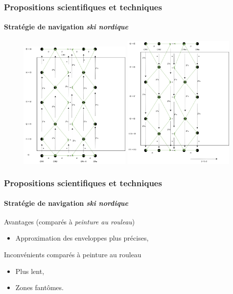 \documentclass{beamer}
\begin{document}
			\begin{frame}
				\frametitle{Propositions scientifiques et techniques}
				\framesubtitle{Stratégie de navigation \textit{ski nordique}}
				\begin{figure}
					\centering
					\includegraphics[width=0.49\textwidth]{graphics/ski_nordique_1.png}
					\includegraphics[width=0.49\textwidth]{graphics/ski_nordique_2.png}
				\end{figure}
			\end{frame}
			\begin{frame}
				\frametitle{Propositions scientifiques et techniques}
				\framesubtitle{Stratégie de navigation \textit{ski nordique}}
				\begin{exampleblock}{Avantages (comparés à \textit{peinture au rouleau})}
					\begin{itemize}
						\item Approximation des enveloppes plus précises,
					\end{itemize}
				\end{exampleblock}
				\begin{alertblock}{Inconvénients comparés à peinture au rouleau}
					\begin{itemize}
						\item Plus lent,
						\item Zones fantômes.
					\end{itemize}
				\end{alertblock}
			\end{frame}
\end{document}
